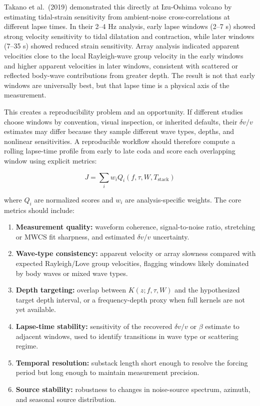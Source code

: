 \documentclass[12pt]{article}
\providecommand{\tightlist}{%
  \setlength{\itemsep}{0pt}\setlength{\parskip}{0pt}}
\begin{document}
Takano et al.~(2019) demonstrated this directly at Izu-Oshima volcano by
estimating tidal-strain sensitivity from ambient-noise
cross-correlations at different lapse times. In their 2--4 Hz analysis,
early lapse windows (2--7 s) showed strong velocity sensitivity to tidal
dilatation and contraction, while later windows (7--35 s) showed reduced
strain sensitivity. Array analysis indicated apparent velocities close
to the local Rayleigh-wave group velocity in the early windows and
higher apparent velocities in later windows, consistent with scattered
or reflected body-wave contributions from greater depth. The result is
not that early windows are universally best, but that lapse time is a
physical axis of the measurement.

This creates a reproducibility problem and an opportunity. If different
studies choose windows by convention, visual inspection, or inherited
defaults, their \(\delta v/v\) estimates may differ because they sample
different wave types, depths, and nonlinear sensitivities. A
reproducible workflow should therefore compute a rolling lapse-time
profile from early to late coda and score each overlapping window using
explicit metrics:

\[J = \sum_i w_i Q_i(f,\tau,W,T_{\mathrm{stack}}) \tag{16}\]

where \(Q_i\) are normalized scores and \(w_i\) are analysis-specific
weights. The core metrics should include:

\begin{enumerate}
\def\labelenumi{\arabic{enumi}.}
\tightlist
\item
  \textbf{Measurement quality:} waveform coherence, signal-to-noise
  ratio, stretching or MWCS fit sharpness, and estimated \(\delta v/v\)
  uncertainty.
\item
  \textbf{Wave-type consistency:} apparent velocity or array slowness
  compared with expected Rayleigh/Love group velocities, flagging
  windows likely dominated by body waves or mixed wave types.
\item
  \textbf{Depth targeting:} overlap between \(K(z; f,\tau,W)\) and the
  hypothesized target depth interval, or a frequency-depth proxy when
  full kernels are not yet available.
\item
  \textbf{Lapse-time stability:} sensitivity of the recovered
  \(\delta v/v\) or \(\beta\) estimate to adjacent windows, used to
  identify transitions in wave type or scattering regime.
\item
  \textbf{Temporal resolution:} substack length short enough to resolve
  the forcing period but long enough to maintain measurement precision.
\item
  \textbf{Source stability:} robustness to changes in noise-source
  spectrum, azimuth, and seasonal source distribution.
\end{enumerate}
\end{document}
